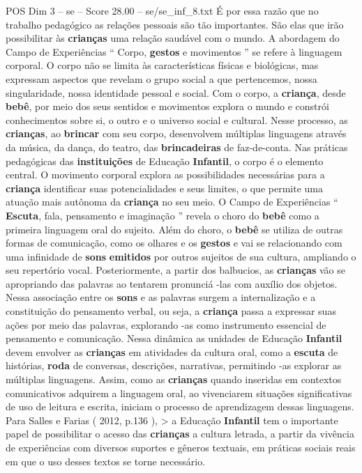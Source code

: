 \begin{textsample}{POS Dim 3 – se – Score 28.00 – se/se\_inf\_8.txt}
É por essa razão que no trabalho pedagógico as relações pessoais são tão importantes.
São elas que irão possibilitar às \textbf{crianças} uma relação saudável com o mundo.
A abordagem do Campo de Experiências “ Corpo, \textbf{gestos} e movimentos ” se refere à linguagem corporal.
O corpo não se limita às características físicas e biológicas, mas expressam aspectos que revelam o grupo social a que pertencemos, nossa singularidade, nossa identidade pessoal e social.
Com o corpo, a \textbf{criança}, desde \textbf{bebê}, por meio dos seus sentidos e movimentos explora o mundo e constrói conhecimentos sobre si, o outro e o universo social e cultural.
Nesse processo, as \textbf{crianças}, ao \textbf{brincar} com seu corpo, desenvolvem múltiplas linguagens através da música, da dança, do teatro, das \textbf{brincadeiras} de faz-de-conta.
Nas práticas pedagógicas das \textbf{instituições} de Educação \textbf{Infantil}, o corpo é o elemento central.
O movimento corporal explora as possibilidades necessárias para a \textbf{criança} identificar suas potencialidades e seus limites, o que permite uma atuação mais autônoma da \textbf{criança} no seu meio.
O Campo de Experiências “ \textbf{Escuta}, fala, pensamento e imaginação ” revela o choro do \textbf{bebê} como a primeira linguagem oral do sujeito.
Além do choro, o \textbf{bebê} se utiliza de outras formas de comunicação, como os olhares e os \textbf{gestos} e vai se relacionando com uma infinidade de \textbf{sons} \textbf{emitidos} por outros sujeitos de sua cultura, ampliando o seu repertório vocal.
Posteriormente, a partir dos balbucios, as \textbf{crianças} vão se apropriando das palavras ao tentarem pronunciá -las com auxílio dos objetos.
Nessa associação entre os \textbf{sons} e as palavras surgem a internalização e a constituição do pensamento verbal, ou seja, a \textbf{criança} passa a expressar suas ações por meio das palavras, explorando -as como instrumento essencial de pensamento e comunicação.
Nessa dinâmica as unidades de Educação \textbf{Infantil} devem envolver as \textbf{crianças} em atividades da cultura oral, como a \textbf{escuta} de histórias, \textbf{roda} de conversas, descrições, narrativas, permitindo -as explorar as múltiplas linguagens.
Assim, como as \textbf{crianças} quando inseridas em contextos comunicativos adquirem a linguagem oral, ao vivenciarem situações significativas de uso de leitura e escrita, iniciam o processo de aprendizagem dessas linguagens.
Para Salles e Farias ( 2012, p.136 ), > a Educação \textbf{Infantil} tem o importante papel de possibilitar o acesso das \textbf{crianças} a cultura letrada, a partir da vivência de experiências com diversos suportes e gêneros textuais, em práticas sociais reais em que o uso desses textos se torne necessário.

\end{textsample}
